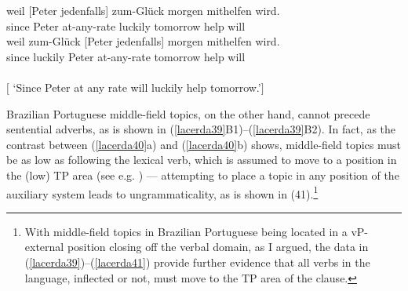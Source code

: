 \documentclass[output=paper]{langscibook}
\begin{document}
\begin{exe}
\ex \label{lacerda38}
\begin{xlist}
\ex \label{lacerda38a}
\gll weil 	[Peter 	jedenfalls] 	zum-Glück 	morgen 	mithelfen 	wird.\\
since 	Peter 	at-any-rate 	luckily 	tomorrow 	help 	will\\

\ex \label{lacerda38b}
\gll *weil 	zum-Glück 	[Peter 	jedenfalls] morgen 	mithelfen 	wird.\\
since 	luckily 	Peter 	at-any-rate	tomorrow 	help 	will\\\\
$\lbrack$ ‘Since Peter at any rate will luckily help tomorrow.’$\rbrack$\\
\citep[162]{Frey2004}
\end{xlist}
\end{exe}

Brazilian Portuguese middle-field topics, on the other hand, cannot precede sentential adverbs, as is shown in (\ref{lacerda39}B1)–(\ref{lacerda39}B2). In fact, as the contrast between (\ref{lacerda40}a) and (\ref{lacerda40}b) shows, middle-field topics must be as low as following the lexical verb, which is assumed to move to a  position in the (low) TP area (see e.g. \citealt{TescariNeto2013}) — attempting to place a topic in any position of the auxiliary system leads to ungrammaticality, as is shown in (41).\footnote{With middle-field topics in Brazilian Portuguese being located in a vP-external position closing off the verbal domain, as I argued, the data in (\ref{lacerda39})–(\ref{lacerda41}) provide further evidence that all verbs in the language, inflected or not, must move to the TP area of the clause.}
\end{document}
